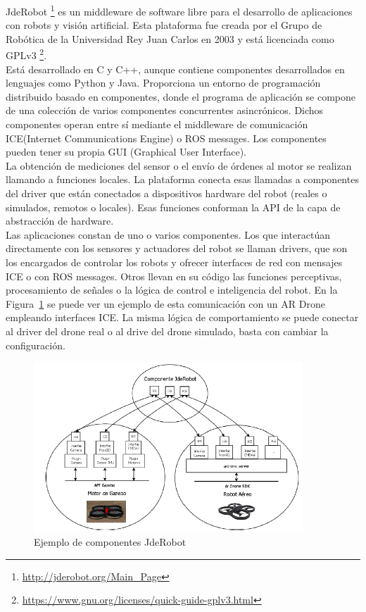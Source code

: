 JdeRobot \footnote{\url{http://jderobot.org/Main_Page}} es un middleware de software libre para el desarrollo de aplicaciones con robots y visión artificial. Esta plataforma fue creada por el Grupo de Robótica de la Universidad Rey Juan Carlos en 2003 y está licenciada como GPLv3 \footnote{\url{https://www.gnu.org/licenses/quick-guide-gplv3.html}}.\\

Está desarrollado en C y C++, aunque contiene componentes desarrollados en lenguajes como Python y Java. Proporciona un entorno de programación distribuido basado en componentes, donde el programa de aplicación se compone de una colección de varios componentes concurrentes asincrónicos. Dichos componentes operan entre sí mediante el middleware de comunicación ICE(Internet Communications Engine) o ROS messages. Los componentes pueden tener su propia GUI (Graphical User Interface).\\

La obtención de mediciones del sensor o el envío de órdenes al motor se realizan llamando a funciones locales. La plataforma conecta esas llamadas a componentes del driver que están conectados a dispositivos hardware del robot (reales o simulados, remotos o locales). Esas funciones conforman la API de la capa de abstracción de hardware. \\

Las aplicaciones constan de uno o varios componentes. Los que interactúan directamente con los sensores y actuadores del robot se llaman drivers, que son los encargados de controlar los robots y ofrecer interfaces de red con mensajes ICE o con ROS messages. Otros llevan en su código las funciones perceptivas, procesamiento de señales o la lógica de control e inteligencia del robot. En la Figura~\ref{fig.jderobot} se puede ver un ejemplo de esta comunicación con un AR Drone empleando interfaces ICE. La misma lógica de comportamiento se puede conectar al driver del drone real o al drive del drone simulado, basta con cambiar la configuración.

\begin{figure}[H]
  \begin{center}
    \includegraphics[width=0.9\textwidth]{figures/Infraestructura/jderobot.png}
		\caption{Ejemplo de componentes JdeRobot}
		\label{fig.jderobot}
		\end{center}
\end{figure}

